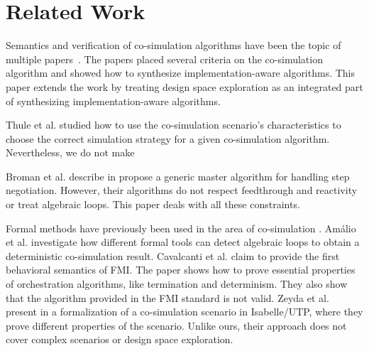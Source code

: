 \section{Related Work}\label{sc:related}
Semantics and verification of co-simulation algorithms have been the topic of multiple papers~\cite{Gomes2019c,Gomes2019a,Broman2013,thrane2021}. 
The papers \cite{Gomes2019c,thrane2021} placed several criteria on the co-simulation algorithm and showed how to synthesize implementation-aware algorithms.
This paper extends the work by treating design space exploration as an integrated part of synthesizing implementation-aware algorithms. 

Thule et al. \cite{Thule_2018} studied how to use the co-simulation scenario's characteristics to choose the correct simulation strategy for a given co-simulation algorithm. 
Nevertheless, we do not make 

Broman et al. describe in \cite{Broman2013} propose a generic master algorithm for handling step negotiation. 
However, their algorithms do not respect feedthrough and reactivity or treat algebraic loops. 
This paper deals with all these constraints.

Formal methods have previously been used in the area of co-simulation \cite{Amalio2016,sampaio_behavioural_2016,cerone_formalising_2018,hansen_verification_2021}.
Amálio et al. \cite{Amalio2016} investigate how different formal tools can detect algebraic loops to obtain a deterministic co-simulation result. 
Cavalcanti et al. \cite{sampaio_behavioural_2016} claim to provide the first behavioral semantics of FMI. 
The paper shows how to prove essential properties of orchestration algorithms, like termination and determinism. 
They also show that the algorithm provided in the FMI standard is not valid. 
Zeyda et al. present in \cite{cerone_formalising_2018}  a formalization of a co-simulation scenario in Isabelle/UTP, where they prove different properties of the scenario.
Unlike ours, their approach does not cover complex scenarios or design space exploration.